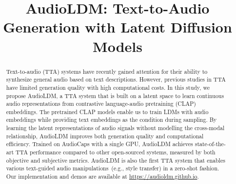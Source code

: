 \title{AudioLDM: Text-to-Audio Generation with Latent Diffusion Models}




\printAffiliationsAndNotice{\icmlEqualContribution} %

\begin{abstract}

Text-to-audio (TTA) systems have recently gained attention for their ability to synthesize general audio based on text descriptions.
However, previous studies in TTA have limited generation quality with high computational costs.
In this study, we propose AudioLDM, a TTA system that is built on a latent space to learn continuous audio representations from contrastive language-audio pretraining (CLAP) embeddings.
The pretrained CLAP models enable us to train LDMs with audio embeddings while providing text embeddings as the condition during sampling. 
By learning the latent representations of audio signals without modelling the cross-modal relationship, AudioLDM improves both generation quality and computational efficiency. 
Trained on AudioCaps with a single GPU, AudioLDM achieves state-of-the-art TTA performance compared to other open-sourced systems, measured by both objective and subjective metrics. AudioLDM is also the first TTA system that enables various text-guided audio manipulations~(e.g., style transfer) in a zero-shot fashion. Our implementation and demos are available at \url{https://audioldm.github.io}.

\end{abstract}

